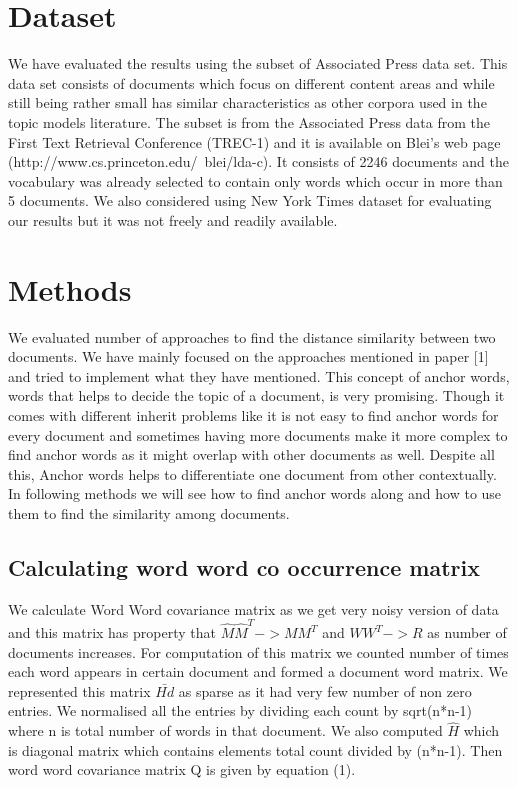 \documentclass[a4paper,11pt]{article}
\begin{document}
\section{Dataset}
We have evaluated the results using the subset of Associated Press data set. This data set consists of documents which focus on different content areas and while still being rather small has similar characteristics as other corpora used in the topic models literature. The subset is from the Associated Press data from the First Text Retrieval Conference (TREC-1) and it is available on Blei's web page (http://www.cs.princeton.edu/~blei/lda-c). It consists of 2246 documents and the vocabulary was already selected to contain only words which occur in more than 5 documents. We also considered using New York Times dataset for evaluating our results but it was not freely and readily available.

\section{Methods}
We evaluated number of approaches to find the distance similarity between two documents. We have mainly focused on the approaches mentioned in paper [1] and tried to implement what they have mentioned. This concept of anchor words, words that helps to decide the topic of a document, is very promising. Though it comes with different inherit problems like it is not easy to find anchor words for every document and sometimes having more documents make it more complex to find anchor words as it might overlap with other documents as well. Despite all this, Anchor words helps to differentiate one document from other contextually. In following methods we will see how to find anchor words along and how to use them to find the similarity among documents. \\

\subsection{Calculating word word co occurrence matrix}
We calculate Word Word covariance matrix as we get very noisy version of data and this matrix has property that  $\hat{M} \hat{M}^T -> M M^T $ and $W W^T -> R$ as number of documents increases. For computation of this matrix we counted number of times each word appears in certain document and formed a document word matrix. We represented this matrix $\bar{Hd}$ as sparse as it had very few number of non zero entries. We normalised all the entries by dividing each count by sqrt(n*n-1) where n is total number of words in that document. We also computed $\hat{H}$ which is diagonal matrix which contains elements total count divided by (n*n-1). Then word word covariance matrix Q is given by equation (1).
\end{document}
